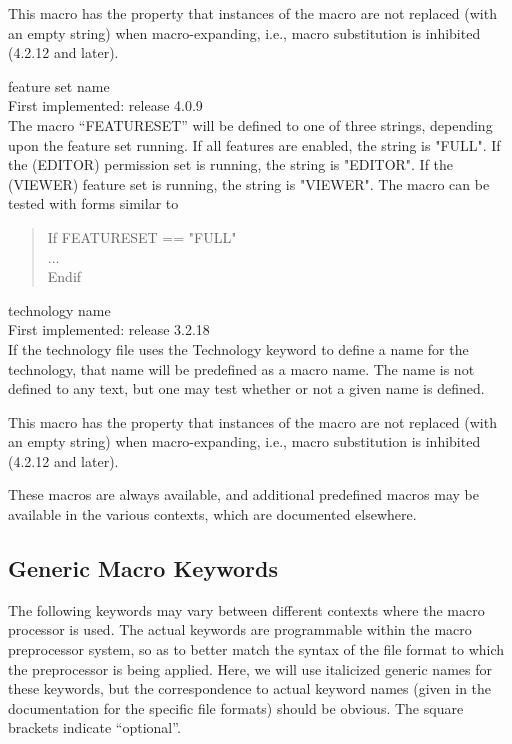 \begin{description}
This macro has the property that instances of the macro are not
replaced (with an empty string) when macro-expanding, i.e., macro
substitution is inhibited (4.2.12 and later).
 
\item{feature set name}\\
First implemented:  release 4.0.9\\
The macro ``{\vt FEATURESET}'' will be defined to one of three
strings, depending upon the feature set running.  If all features are
enabled, the string is {\vt "FULL"}.  If the {\XicII} (EDITOR)
permission set is running, the string is {\vt "EDITOR"}.  If the
{\Xiv} (VIEWER) feature set is running, the string is {\vt "VIEWER"}. 
The macro can be tested with forms similar to
\begin{quote}\vt
If FEATURESET == "FULL"\\
...\\
Endif
\end{quote}

\item{technology name}\\
First implemented: release 3.2.18\\
If the technology file uses the {\vt Technology} keyword to define a
name for the technology, that name will be predefined as a macro
name.  The name is not defined to any text, but one may test whether
or not a given name is defined.

This macro has the property that instances of the macro are not
replaced (with an empty string) when macro-expanding, i.e., macro
substitution is inhibited (4.2.12 and later).
\end{description}

These macros are always available, and additional predefined macros
may be available in the various contexts, which are documented
elsewhere.

\subsection{Generic Macro Keywords}

The following keywords may vary between different contexts where the
macro processor is used.  The actual keywords are programmable within
the macro preprocessor system, so as to better match the syntax of the
file format to which the preprocessor is being applied.  Here, we will
use italicized generic names for these keywords, but the
correspondence to actual keyword names (given in the documentation for
the specific file formats) should be obvious.  The square brackets
indicate ``optional''.

